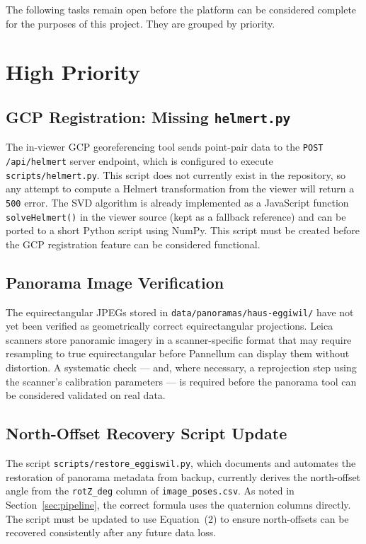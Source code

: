 The following tasks remain open before the platform can be considered complete
for the purposes of this project. They are grouped by priority.

\section{High Priority}
\label{sec:tasks_high}

\subsection{GCP Registration: Missing \texttt{helmert.py}}

The in-viewer GCP georeferencing tool sends point-pair data to the
\texttt{POST /api/helmert} server endpoint, which is configured to execute
\texttt{scripts/helmert.py}. This script does not currently exist in the
repository, so any attempt to compute a Helmert transformation from the
viewer will return a \texttt{500} error. The SVD algorithm is already
implemented as a JavaScript function \texttt{solveHelmert()} in the viewer
source (kept as a fallback reference) and can be ported to a short Python
script using NumPy. This script must be created before the GCP registration
feature can be considered functional.

\subsection{Panorama Image Verification}

The equirectangular JPEGs stored in \texttt{data/panoramas/haus-eggiwil/}
have not yet been verified as geometrically correct equirectangular
projections. Leica scanners store panoramic imagery in a scanner-specific
format that may require resampling to true equirectangular before Pannellum
can display them without distortion. A systematic check — and, where
necessary, a reprojection step using the scanner's calibration parameters
— is required before the panorama tool can be considered validated on real data.

\subsection{North-Offset Recovery Script Update}

The script \texttt{scripts/restore\_eggiswil.py}, which documents and
automates the restoration of panorama metadata from backup, currently derives
the north-offset angle from the \texttt{rotZ\_deg} column of
\texttt{image\_poses.csv}. As noted in Section~\ref{sec:pipeline}, the
correct formula uses the quaternion columns directly. The script must be
updated to use Equation~(2) to ensure north-offsets can be recovered
consistently after any future data loss.

